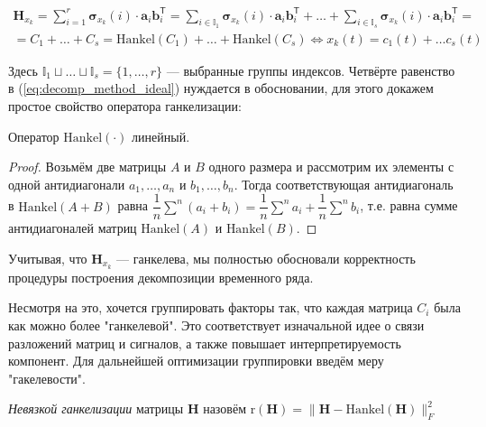 	    	\begin{multline}\label{eq:decomp_method_ideal}
	    		\mathbf{H}_{x_k} = \sum\limits_{i = 1}^{r} \boldsymbol{\sigma}_{x_k}(i) \cdot \mathbf{a}_i  \mathbf{b}_i^{\mathsf{T}} = \sum\limits_{i \in \mathbb{I}_1} \boldsymbol{\sigma}_{x_k}(i) \cdot \mathbf{a}_i  \mathbf{b}_i^{\mathsf{T}} + \ldots + \sum\limits_{i \in \mathbb{I}_s} \boldsymbol{\sigma}_{x_k}(i) \cdot \mathbf{a}_i  \mathbf{b}_i^{\mathsf{T}} = \\ = C_1 + \ldots + C_s = \text{Hankel}(C_1) + \ldots + \text{Hankel}(C_s)  \Leftrightarrow x_k(t) = c_1(t) + \ldots c_s(t)
	    	\end{multline}
	    	
	    	Здесь $ \mathbb{I}_1 \sqcup \ldots \sqcup \mathbb{I}_s = \{1, \ldots, r\} $ --- выбранные группы индексов. Четвёрте равенство в (\ref{eq:decomp_method_ideal}) нуждается в обосновании, для этого докажем простое свойство оператора ганкелизации:
	    	
	    	\begin{Lem}
	    		Оператор $ \text{Hankel}(\cdot) $ линейный.
	    	\end{Lem}
	    	
	    	\begin{proof}
	    		Возьмём две матрицы $ A $ и $ B $ одного размера и рассмотрим их элементы с одной антидиагонали $ a_1, \ldots, a_n $ и $ b_1, \ldots, b_n $. Тогда соответствующая антидиагональ в $ \text{Hankel}(A + B) $ равна $ \dfrac{1}{n} \sum\limits^n (a_i + b_i) = \dfrac{1}{n} \sum\limits^n a_i + \dfrac{1}{n} \sum\limits^n b_i $, т.е. равна сумме антидиагоналей матриц $ \text{Hankel}(A) $ и $ \text{Hankel}(B) $.
	    	\end{proof}
	    	
	    	Учитывая, что $ \mathbf{H}_{x_k} $ --- ганкелева, мы полностью обосновали корректность процедуры построения декомпозиции временного ряда.
	    	
	    	Несмотря на это, хочется группировать факторы так, что каждая матрица $ C_i $ была как можно более "ганкелевой". Это соответствует изначальной идее о связи разложений матриц и сигналов, а также повышает интерпретируемость компонент.    Для дальнейшей оптимизации группировки введём меру "гакелевости".
	    	
	    	\begin{Def}
	    		\emph{Невязкой ганкелизации} матрицы $ \mathbf{H} $ назовём $ \text{r}(\mathbf{H}) = \lVert \mathbf{H} - \text{Hankel}(\mathbf{H}) \rVert_{F}^2 $ 
	    	\end{Def}
	    	
